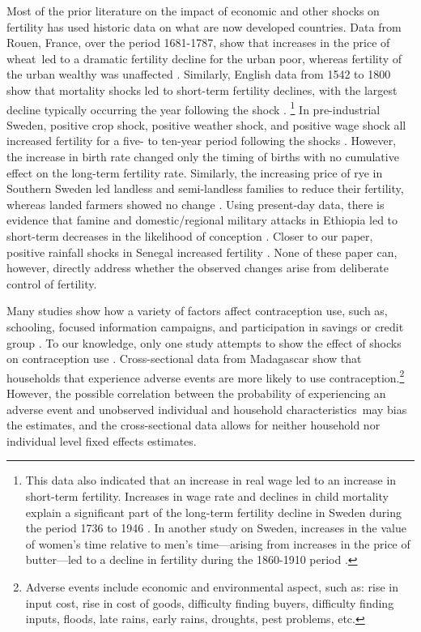 \documentclass[letterpaper,12pt]{article}
\begin{document}
Most of the prior literature on the impact of economic and other shocks on fertility 
has used historic data on what are now developed countries.
Data from Rouen, France, over the period 1681-1787, show that increases in the
price of wheat led to a dramatic fertility decline for the urban poor, 
whereas fertility of the urban wealthy was unaffected \citep{Galloway1987}.
Similarly, English data from 1542 to 1800 show that mortality shocks led to short-term
fertility declines, with the largest decline typically occurring  the year following 
the shock \citep{Bailey1998}.%
\footnote{
This data also indicated that an increase in real wage led to an increase in short-term 
fertility.
Increases in wage rate and declines in child mortality explain a significant part of the 
long-term fertility decline in Sweden during the period 1736 to 1946 \citep{Eckstein1999a}.
In another study on Sweden, increases in the value of women's time relative to men's 
time---arising from increases in the price of butter---led to a decline in fertility during 
the  1860-1910 period \citep{Schultz1985}. 
}
In pre-industrial Sweden, positive crop shock, positive weather shock, and 
positive wage shock all increased fertility for a five- to ten-year period following 
the shocks \citep{Eckstein1985}.
However, the increase in birth rate changed only the timing of births with no 
cumulative effect on the long-term fertility rate.
Similarly, the increasing price of rye in Southern Sweden led landless and 
semi-landless families to reduce their fertility, whereas landed farmers 
showed no change \citep{bengtsson06}.
Using present-day data, there is evidence that famine and domestic/regional 
military attacks in Ethiopia led to short-term decreases in the likelihood of 
conception \citep{lindstrom99}.
Closer to our paper, positive rainfall shocks in Senegal increased 
fertility \citep{pitt98b}.
None of these paper can, however, directly address whether the observed changes 
arise from deliberate control of fertility.

Many studies show how a variety of factors affect contraception use, such 
as, 
schooling, 
focused information campaigns, and
participation in savings or credit group 
\citep{Ainsworth1996,Feyisetan1996,Steele2001,Chen2003}.
To our knowledge, only one study attempts to show the effect of shocks on 
contraception use \citep{Hernandez-Correa2010}. 
Cross-sectional data from Madagascar show that households that experience adverse 
events are more likely to use contraception.\footnote{%
Adverse events include economic and environmental aspect, such as: rise in input 
cost, rise in cost of goods, difficulty finding buyers, difficulty finding inputs, 
floods, late rains, early rains, droughts, pest problems, etc. 
} 
However, 
the possible correlation between the probability of experiencing 
an adverse event and unobserved individual and household characteristics may 
bias the estimates, and the cross-sectional data allows for neither household 
nor individual level fixed effects estimates.
\end{document}
